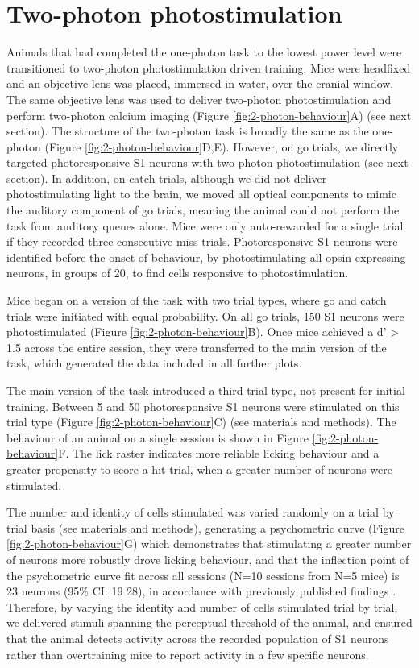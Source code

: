 \section{Two-photon photostimulation}

Animals that had completed the one-photon task to the lowest power level were transitioned to two-photon photostimulation driven training. Mice were headfixed and an objective lens was placed, immersed in water, over the cranial window. The same objective lens was used to deliver two-photon photostimulation and perform two-photon calcium imaging (Figure \ref{fig:2-photon-behaviour}A) (see next section). The structure of the two-photon task is broadly the same as the one-photon (Figure \ref{fig:2-photon-behaviour}D,E). However, on go trials, we directly targeted photoresponsive S1 neurons with two-photon photostimulation (see next section). In addition, on catch trials, although we did not deliver photostimulating light to the brain, we moved all optical components to mimic the auditory component of go trials, meaning the animal could not perform the task from auditory queues alone. Mice were only auto-rewarded for a single trial if they recorded three consecutive miss trials. Photoresponsive S1 neurons were identified before the onset of behaviour, by photostimulating all opsin expressing neurons, in groups of 20, to find cells responsive to photostimulation.

Mice began on a version of the task with two trial types, where go and catch trials were initiated with equal probability. On all go trials, 150 S1 neurons were photostimulated (Figure \ref{fig:2-photon-behaviour}B). Once mice achieved a d' > 1.5 across the entire session, they were transferred to the main version of the task, which generated the data included in all further plots.

The main version of the task introduced a third trial type, not present for initial training. Between 5 and 50 photoresponsive S1 neurons were stimulated on this trial type (Figure \ref{fig:2-photon-behaviour}C) (see materials and methods). The behaviour of an animal on a single session is shown in Figure \ref{fig:2-photon-behaviour}F. The lick raster indicates more reliable licking behaviour and a greater propensity to score a hit trial, when a greater number of neurons were stimulated.

The number and identity of cells stimulated was varied randomly on a trial by trial basis (see materials and methods), generating a psychometric curve (Figure \ref{fig:2-photon-behaviour}G) which demonstrates that stimulating a greater number of neurons more robustly drove licking behaviour, and that the inflection point of the psychometric curve fit across all sessions (N=10 sessions from N=5 mice) is 23 neurons (95\% CI: 19 28), in accordance with previously published findings \cite{dalgleish_how_2020}. Therefore, by varying the identity and number of cells stimulated trial by trial, we delivered stimuli spanning the perceptual threshold of the animal, and ensured that the animal detects activity across the recorded population of S1 neurons rather than overtraining mice to report activity in a few specific neurons.

